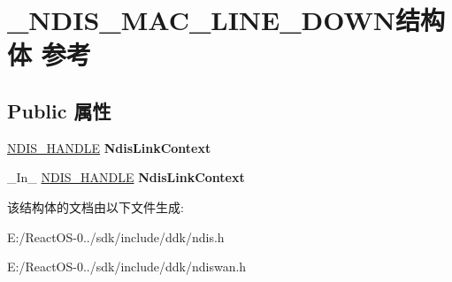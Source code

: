 \hypertarget{struct___n_d_i_s___m_a_c___l_i_n_e___d_o_w_n}{}\section{\+\_\+\+N\+D\+I\+S\+\_\+\+M\+A\+C\+\_\+\+L\+I\+N\+E\+\_\+\+D\+O\+W\+N结构体 参考}
\label{struct___n_d_i_s___m_a_c___l_i_n_e___d_o_w_n}
\subsection*{Public 属性}
\begin{DoxyCompactItemize}
\item 
\mbox{\label{struct___n_d_i_s___m_a_c___l_i_n_e___d_o_w_n_a3aabb23401be6c9a228fbb7c92e68f8f}} 
\hyperlink{interfacevoid}{N\+D\+I\+S\+\_\+\+H\+A\+N\+D\+LE} {\bfseries Ndis\+Link\+Context}
\item 
\mbox{\label{struct___n_d_i_s___m_a_c___l_i_n_e___d_o_w_n_a88731f86b7fc3cd0f77b9217c073a3eb}} 
\+\_\+\+In\+\_\+ \hyperlink{interfacevoid}{N\+D\+I\+S\+\_\+\+H\+A\+N\+D\+LE} {\bfseries Ndis\+Link\+Context}
\end{DoxyCompactItemize}


该结构体的文档由以下文件生成\+:\begin{DoxyCompactItemize}
\item 
E\+:/\+React\+O\+S-\/0../sdk/include/ddk/ndis.\+h\item 
E\+:/\+React\+O\+S-\/0../sdk/include/ddk/ndiswan.\+h\end{DoxyCompactItemize}
